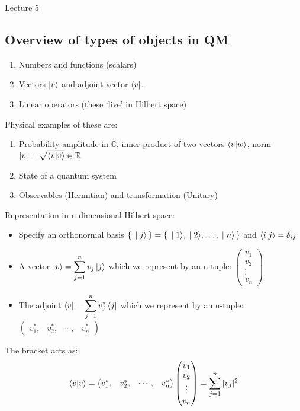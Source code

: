 \begin{center}

Lecture 5

\end{center}

\subsection{Overview of types of objects in QM}

\begin{enumerate}
\item Numbers and functions (scalars)
\item Vectors $\ket{v}$ and adjoint vector $\bra{v}$.
\item Linear operators (these `live' in Hilbert space)
\end{enumerate}

Physical examples of these are:
\begin{enumerate}
\item Probability amplitude in $\mathbb{C}$, inner product of two vectors $\braket{v|w}$, norm $|v| = \sqrt{\braket{v|v}} \in \mathbb{R}$
\item State of a quantum system
\item Observables (Hermitian) and transformation (Unitary)
\end{enumerate}

Representation in n-dimensional Hilbert space:
\begin{itemize}
\item Specify an orthonormal basis $\set{\ket{j}} = \set{\ket{1}, \ket{2}, \ldots,\ket{n}}$ and $\braket{i|j} = \delta_{ij}$
\item A vector $\ket{v} = \displaystyle \sum_{j=1}^{n} v_j \ket{j}$ which we represent by an n-tuple: $\begin{pmatrix} v_1 \\ v_2 \\ \vdots \\ v_n \end{pmatrix}$
\item The adjoint $\bra{v} = \displaystyle \sum_{j=1}^{n} v_j^{*} \bra{j}$ which we represent by an n-tuple: $\begin{pmatrix} v_1^{*} ,& v_2^{*} ,& \cdots ,& v_n^{*} \end{pmatrix}$
\end{itemize}

The bracket acts as: $$\braket{v|v} = \begin{pmatrix} v_1^{*}  ,& v_2^{*} ,& \cdots ,& v_n^{*} \end{pmatrix} \begin{pmatrix} v_1 \\ v_2 \\ \vdots \\ v_n \end{pmatrix} = \sum_{j=1}^{n} |v_j|^2$$

